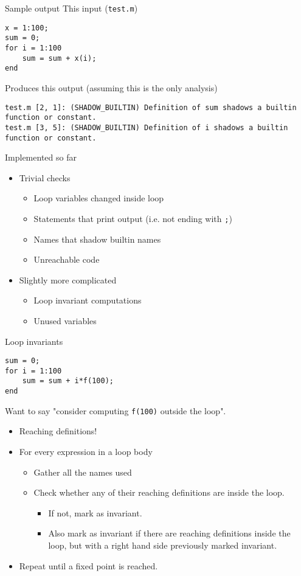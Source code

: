 \documentclass{beamer}
\begin{document}
\begin{frame}[fragile]{Sample output}
This input ({\tt test.m})
\begin{lstlisting}[basicstyle=\ttfamily]
x = 1:100;
sum = 0;
for i = 1:100
    sum = sum + x(i);
end
\end{lstlisting}
Produces this output (assuming this is the only analysis)
\begin{lstlisting}
test.m [2, 1]: (SHADOW_BUILTIN) Definition of sum shadows a builtin function or constant.
test.m [3, 5]: (SHADOW_BUILTIN) Definition of i shadows a builtin function or constant.
\end{lstlisting}
\end{frame}

\begin{frame}{Implemented so far}
\begin{itemize}
\item Trivial checks
    \begin{itemize}
    \item Loop variables changed inside loop
    \item Statements that print output (i.e. not ending with {\tt ;})
    \item Names that shadow builtin names
    \item Unreachable code
    \end{itemize}
\item Slightly more complicated
    \begin{itemize}
    \item Loop invariant computations
    \item Unused variables
    \end{itemize}
\end{itemize}
\end{frame}

\begin{frame}[fragile]{Loop invariants}
\begin{lstlisting}[basicstyle=\ttfamily]
sum = 0;
for i = 1:100
    sum = sum + i*f(100);
end
\end{lstlisting}
Want to say "consider computing {\tt f(100)} outside the loop". 
\begin{itemize}
\item Reaching definitions!
\item For every expression in a loop body
    \begin{itemize}
    \item Gather all the names used
    \item Check whether any of their reaching definitions are inside the loop. 
        \begin{itemize}
        \item If not, mark as invariant. 
        \item Also mark as invariant if there are reaching definitions
        inside the loop, but with a right hand side previously marked
        invariant.
        \end{itemize}
    \end{itemize}
    \item Repeat until a fixed point is reached.
\end{itemize}
\end{frame}
\end{document}
